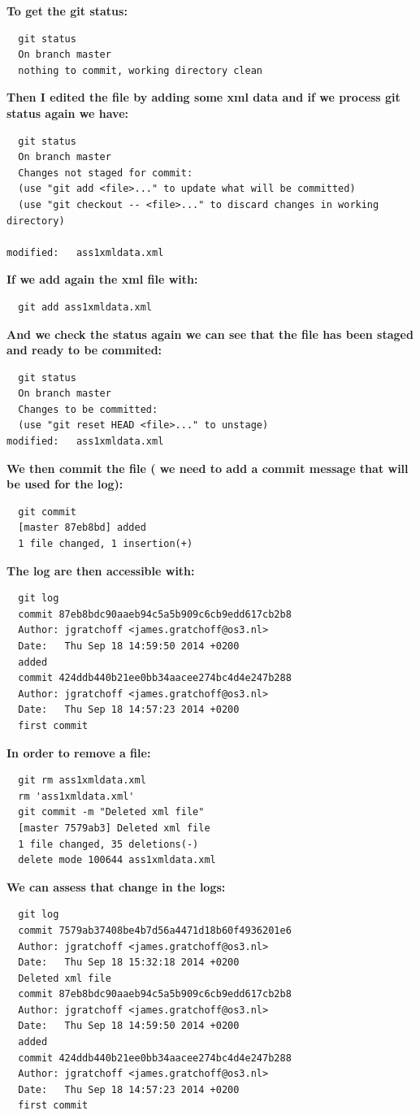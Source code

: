 \textbf{To get the git status:}
\begin{lstlisting}
  git status
  On branch master 
  nothing to commit, working directory clean
\end{lstlisting}
\textbf{Then I edited the file by adding some xml data and if we process git status again we have:}
\begin{lstlisting}
  git status
  On branch master
  Changes not staged for commit:
  (use "git add <file>..." to update what will be committed)
  (use "git checkout -- <file>..." to discard changes in working directory)

modified:   ass1xmldata.xml
\end{lstlisting}
\textbf{If we add again the xml file with:}
\begin{lstlisting}
  git add ass1xmldata.xml 
\end{lstlisting}
\textbf{And we check the status again we can see that the file has been staged and ready to be commited:}
\begin{lstlisting}
  git status
  On branch master
  Changes to be committed:
  (use "git reset HEAD <file>..." to unstage)
modified:   ass1xmldata.xml
\end{lstlisting}
\textbf{We then commit the file ( we need to add a commit message that will be used for the log):}
\begin{lstlisting}
  git commit 
  [master 87eb8bd] added
  1 file changed, 1 insertion(+)
\end{lstlisting}
\textbf{The log are then accessible with:}
\begin{lstlisting}
  git log
  commit 87eb8bdc90aaeb94c5a5b909c6cb9edd617cb2b8
  Author: jgratchoff <james.gratchoff@os3.nl>
  Date:   Thu Sep 18 14:59:50 2014 +0200
  added
  commit 424ddb440b21ee0bb34aacee274bc4d4e247b288
  Author: jgratchoff <james.gratchoff@os3.nl>
  Date:   Thu Sep 18 14:57:23 2014 +0200
  first commit
\end{lstlisting}
\textbf{In order to remove a file:}
\begin{lstlisting}
  git rm ass1xmldata.xml 
  rm 'ass1xmldata.xml'
  git commit -m "Deleted xml file"
  [master 7579ab3] Deleted xml file
  1 file changed, 35 deletions(-)
  delete mode 100644 ass1xmldata.xml
\end{lstlisting}
\textbf{We can assess that change in the logs:}
\begin{lstlisting}
  git log
  commit 7579ab37408be4b7d56a4471d18b60f4936201e6
  Author: jgratchoff <james.gratchoff@os3.nl>
  Date:   Thu Sep 18 15:32:18 2014 +0200
  Deleted xml file
  commit 87eb8bdc90aaeb94c5a5b909c6cb9edd617cb2b8
  Author: jgratchoff <james.gratchoff@os3.nl>
  Date:   Thu Sep 18 14:59:50 2014 +0200
  added
  commit 424ddb440b21ee0bb34aacee274bc4d4e247b288
  Author: jgratchoff <james.gratchoff@os3.nl>
  Date:   Thu Sep 18 14:57:23 2014 +0200
  first commit
  \end{lstlisting}